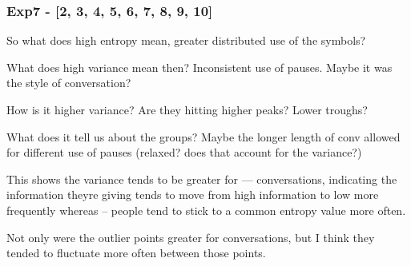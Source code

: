  \subsubsection{Exp7 - [2, 3, 4, 5, 6, 7, 8, 9, 10]}

 

 



So what does high entropy mean, greater distributed use of the symbols? 

What does high variance mean then? Inconsistent use of pauses. Maybe it was the style of conversation? 

How is it higher variance? Are they hitting higher peaks? Lower troughs? 

What does it tell us about the groups? Maybe the longer length of conv allowed for different use of pauses (relaxed? does that account for the variance?)

This shows the variance tends to be greater for --- conversations, indicating the information theyre giving tends to move from high information to low more frequently whereas -- people tend to stick to a common entropy value more often.

Not only were the outlier points greater for conversations, but I think they tended to fluctuate more often between those points.


